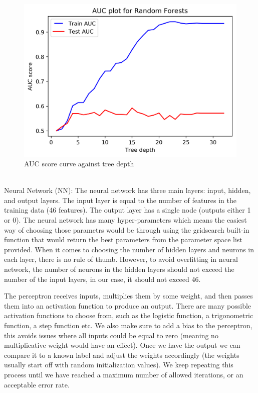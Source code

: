 \begin{figure}[!ht]
 \centering
\includegraphics[width=6.1in]{assignment2/1-3-RandomForests_AUC(TreeDepth).png}
\caption{\label{fig:fig3}AUC score curve against tree depth}
\end{figure}

\\

Neural Network (NN): The neural network has three main layers: input, hidden, and output layers. The input layer is equal to the number of features in the training data (46 features). The output layer has a single node (outputs either 1 or 0). The neural network has many hyper-parameters which means the easiest way of choosing those parametrs would be through using the gridsearch built-in function that would return the best parameters from the parameter space list provided. When it comes to choosing the number of hidden layers and neurons in each layer, there is no rule of thumb. However, to avoid overfitting in neural network, the number of neurons in the hidden layers should not exceed the number of the input layers, in our case, it should not exceed 46. 


The perceptron receives inputs, multiplies them by some weight, and then passes them into an activation function to produce an output. There are many possible activation functions to choose from, such as the logistic function, a trigonometric function, a step function etc. We also make sure to add a bias to the perceptron, this avoids issues where all inputs could be equal to zero (meaning no multiplicative weight would have an effect).
Once we have the output we can compare it to a known label and adjust the weights accordingly (the weights usually start off with random initialization values). We keep repeating this process until we have reached a maximum number of allowed iterations, or an acceptable error rate.
\\
